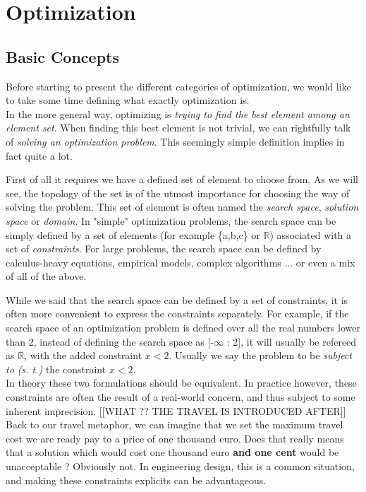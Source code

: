 
\part{Optimization}

\chapter{Basic Concepts}

Before starting to present the different categories of optimization, we would like to take some time defining what exactly optimization is.\\
In the more general way, optimizing is \emph{trying to find the best element among an element set}. When finding this best element is not trivial, we can rightfully talk of \emph{solving an optimization problem}. This seemingly simple definition implies in fact quite a lot.

First of all it requires we have a defined set of element to choose from. As we will see, the topology of the set is of the utmost importance for choosing the way of solving the problem. This set of element is often named the \emph{search space}, \emph{solution space} or \emph{domain}. In "simple" optimization problems, the search space can be simply defined by a set of elements (for example \{a,b,c\} or \ensuremath{\mathbb{R}}) associated with a set of \emph{constraints}. For large problems, the search space can be defined by calculus-heavy equations, empirical models, complex algorithms ... or even a mix of all of the above.


While we said that the search space can be defined by a set of constraints, it is often more convenient to express the constraints separately. For example, if the search space of an optimization problem is defined over all the real numbers lower than 2, instead of defining the search space as [-\(\infty\) : 2], it will usually be refereed as \(\mathbb{R}\), with the added constraint \(x < 2\). Usually we say the problem to be \emph{subject to (s. t.)} the constraint \(x < 2\).\\
In theory these two formulations should be equivalent. In practice however, these constraints are often the result of a real-world concern, and thus subject to some inherent imprecision. [[WHAT ?? THE TRAVEL IS INTRODUCED AFTER]] Back to our travel metaphor, we can imagine that we set the maximum travel cost we are ready pay to a price of one thousand euro. Does that really means that a solution which would cost one thousand euro \textbf{and one cent} would be unacceptable ? Obviously not.  In engineering design, this is a common situation, and making these constraints explicits can be advantageous.

